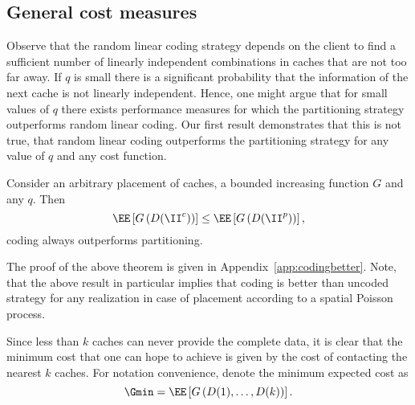 \subsection{General cost measures}

Observe that the random linear coding strategy depends on the client to find a sufficient number of linearly independent combinations in caches that are not too far away. If $q$ is small there is a significant probability that the information of the next cache is not linearly independent. Hence, one might argue that for small values of $q$ there exists performance measures for which the partitioning strategy outperforms random linear coding. Our first result demonstrates that this is not true, \ie that random linear coding outperforms the partitioning strategy for any value of $q$ and any cost function.
\begin{theorem}  \label{th:codingbetter}
Consider an arbitrary placement of caches, a bounded increasing function $G$ and any $q$. Then
\begin{equation*}
\EE\left[ G\left(D(\II^c)\right) \right] \leq \EE\left[ G\left(D(\II^p)\right) \right],
\end{equation*}
\ie coding always outperforms partitioning.
\end{theorem}
The proof of the above theorem is given in Appendix~\ref{app:codingbetter}.
Note, that the above result in particular implies that coding is better than uncoded strategy
for any realization in case of placement according to a spatial Poisson process.



Since less than $k$ caches can never provide the complete data, it is clear that the minimum cost that one can hope to achieve is given by the cost of contacting the nearest $k$ caches. For notation convenience, denote the minimum expected cost as
\begin{equation}
\Gmin= \EE\left[ G\left(D(1), \dots, D(k)\right) \right].
\end{equation}


